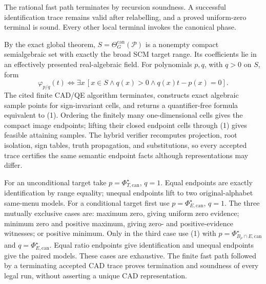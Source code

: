 The rational fast path terminates by recursion soundness.  A successful identification trace remains valid after relabelling, and a proved uniform-zero terminal is sound.  Every other local terminal invokes the canonical phase.

By the exact global theorem, \(S=\Theta_G^{\mathrm{can}}(\mathcal P)\) is a nonempty compact semialgebraic set with exactly the broad SCM target range.  Its coefficients lie in an effectively presented real-algebraic field.  For polynomials \(p,q\), with \(q>0\) on \(S\), form
\[
\varphi_{p/q}(t)\Longleftrightarrow
\exists x\,[x\in S\wedge q(x)>0\wedge q(x)t-p(x)=0].
\tag{1}
\]
The cited finite CAD/QE algorithm terminates, constructs exact algebraic sample points for sign-invariant cells, and returns a quantifier-free formula equivalent to (1).  Ordering the finitely many one-dimensional cells gives the compact image endpoints; lifting their closed endpoint cells through (1) gives feasible attaining samples.  The hybrid verifier recomputes projection, root isolation, sign tables, truth propagation, and substitutions, so every accepted trace certifies the same semantic endpoint facts although representations may differ.

For an unconditional target take \(p=\Phi_{T,\mathrm{can}}^\star\), \(q=1\).  Equal endpoints are exactly identification by range equality; unequal endpoints lift to two original-alphabet same-menu models.  For a conditional target first use \(p=\Phi_{E,\mathrm{can}}^\star\), \(q=1\).  The three mutually exclusive cases are: maximum zero, giving uniform zero evidence; minimum zero and positive maximum, giving zero- and positive-evidence witnesses; or positive minimum.  Only in the third case use (1) with \(p=\Phi_{B_\rho\cap E,\mathrm{can}}^\star\) and \(q=\Phi_{E,\mathrm{can}}^\star\).  Equal ratio endpoints give identification and unequal endpoints give the paired models.  These cases are exhaustive.  The finite fast path followed by a terminating accepted CAD trace proves termination and soundness of every legal run, without asserting a unique CAD representation.